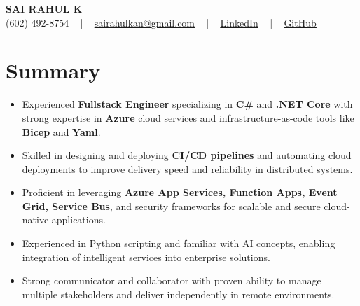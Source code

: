 \documentclass[letterpaper,11pt]{article}
\newcommand{\resumeItem}[1]{
  \item\footnotesize{
    {#1 \vspace{-2pt}}
  }
}
\newcommand{\resumeItemListStart}{\begin{itemize}[leftmargin=*]}
\newcommand{\resumeItemListEnd}{\end{itemize}\vspace{-5pt}}
\begin{document}
\begin{center}
    {\fontsize{14pt}{12pt}\selectfont \textbf{\MakeUppercase{Sai Rahul K}}}\\ \vspace{2pt}
    \fontsize{10pt}{12pt}\selectfont (602) 492-8754 ~ | ~ \href{mailto:sairahulkan@gmail.com}{sairahulkan@gmail.com} ~ | ~
    \href{https://www.linkedin.com/in/rq123/}{\color{blue}\underline{LinkedIn}} ~ | ~
    \href{https://github.com/kanrahuldo}{\color{blue}\underline{GitHub}}~
    \vspace{-8pt}
\end{center}

\section{Summary}
\fontsize{9pt}{10pt}\selectfont
\resumeItemListStart
    \resumeItem{Experienced \textbf{Fullstack Engineer} specializing in \textbf{C\#} and \textbf{.NET Core} with strong expertise in \textbf{Azure} cloud services and infrastructure-as-code tools like \textbf{Bicep} and \textbf{Yaml}.}
    \resumeItem{Skilled in designing and deploying \textbf{CI/CD pipelines} and automating cloud deployments to improve delivery speed and reliability in distributed systems.}
    \resumeItem{Proficient in leveraging \textbf{Azure App Services, Function Apps, Event Grid, Service Bus}, and security frameworks for scalable and secure cloud-native applications.}
    \resumeItem{Experienced in Python scripting and familiar with AI concepts, enabling integration of intelligent services into enterprise solutions.}
    \resumeItem{Strong communicator and collaborator with proven ability to manage multiple stakeholders and deliver independently in remote environments.}
\resumeItemListEnd
\vspace{-6pt}
\end{document}
